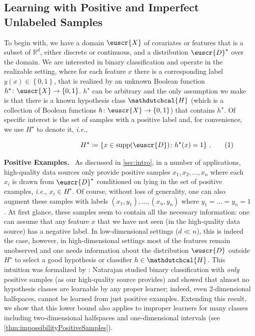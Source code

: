 \documentclass[11pt]{article}
\makeatletter
\theoremstyle{plain}
\theoremstyle{definition}
\theoremstyle{remark}
\newcommand{\yesnum}{\addtocounter{equation}{1}\tag{\theequation}}
\newcommand{\changetag}[1]{%
  \renewcommand\tagform@[1]{\maketag@@@{(\ignorespaces#1\unskip\@@italiccorr)}}%
}
\newcommand{\inbrace}[1]{\left\{#1\right\}}
\newcommand{\R}{\mathbb{R}}
\newcommand{\zo}{\ensuremath{\inbrace{0, 1}}}
\newcommand{\supp}{\operatorname{supp}}
\newcommand{\customcal}[1]{\euscr{#1}}
\newcommand{\cD}{\customcal{D}}
\newcommand{\cX}{\customcal{X}}
\renewcommand{\paragraph}[1]{\medskip \noindent\textbf{#1}~}
\newcommand{\ie}{\textit{i.e.}}
\newcommand{\hypo}[1]{\mathdutchcal{#1}}
\newcommand{\hyH}{\hypo{H}}
\newcommand{\optset}{{H^\star}}
\newcommand{\cDtrue}{\cD^\star}
\makeatother
\begin{document}
    \subsection{Learning with Positive and Imperfect Unlabeled Samples}\label{sec:model}
        To begin with, we have a domain $\cX$ of covariates or features that is a subset of $\R^d$, either discrete or continuous, and a distribution $\cDtrue$ over the domain.
        We are interested in binary classification and operate in the realizable setting, where for each feature $x$ there is a corresponding label $y(x)\in \zo$, that is realized by an unknown Boolean function $h^\star\colon \cX\to \zo$.
        $h^\star$ can be arbitrary and the only assumption we make is that there is a known hypothesis class $\hyH$ (which is a collection of Boolean functions $h\colon \cX\to \zo$) that contains $h^\star$.
        Of specific interest is the set of samples with a positive label and, for convenience, we use $\optset$ to denote it, \ie{}, 
        \changetag{Support of Positive Examples) \ (#1} 
        \[
            \phantom{ABCDEFGHIJK}
            \optset\coloneqq \inbrace{x\in \supp(\cD)\colon h^\star(x)=1}\,.
            \yesnum\label{eq:setOfPositiveExamples}
        \]
        \changetag{#1}
        
        \paragraph{Positive Examples.}
        As discussed in \cref{sec:intro}, in a number of applications, high-quality data sources only provide positive samples $x_1,x_2,\dots,x_n$ where each $x_i$ is drawn from $\cDtrue$ conditioned on lying in the set of positive examples, \ie{}, $x_i\in \optset$. 
        Of course, without loss of generality, one can also augment these samples with labels $(x_1,y_1),\dots,(x_n,y_n)$ where $y_1=\dots=y_n=1$.
        At first glance, these samples seem to contain all the necessary information: one can assume that any feature $x$ that we have not seen (in the high-quality data source) has a negative label.
        In low-dimensional settings ($d\ll n$), this is indeed the case, however, in high-dimensional settings most of the features remain unobserved and one needs information about the distribution $\cD$ outside $\optset$ to select a good hypothesis or classifier $h\in \hyH$.
        This intuition was formalized by \citet{natarajan1987learning}: Natarajan studied binary classification with \textit{only} positive samples (as our high-quality source provides) and showed that almost no hypothesis classes are learnable by any proper learner; indeed, even 2-dimensional halfspaces, cannot be learned from just positive examples.
        Extending this result, we show that this lower bound also applies to improper learners for many classes including two-dimensional halfspaces and one-dimensional intervals (see \cref{thm:impossibilityPositiveSamples}).
\end{document}
